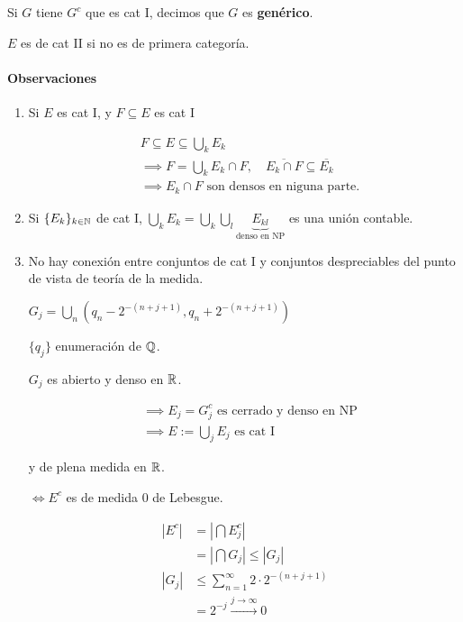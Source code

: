 \begin{fdefinition}
    Si $G$ tiene $G^c$ que es cat I, decimos que $G$ es \textbf{genérico}.
\end{fdefinition}

\begin{fdefinition}
    $E$ es de cat II si no es de primera categoría.
\end{fdefinition}

\paragraph*{Observaciones}

\begin{enumerate}
    \item Si $E$ es cat I, y $F\subseteq E$ es cat I
    
    \begin{align*}&F\subseteq E\subseteq \bigcup_k E_k\\
    &\implies F=\bigcup_k E_k\cap F,\quad \overline{E_k\cap F}\subseteq \overline{E_k}\\
    &\implies E_k\cap F \text{ son densos en niguna parte.}
    \end{align*}

    \item Si $\{E_k\}_{k\in\mathbb{N}}$ de cat I, $\bigcup_{k} E_k=\bigcup_{k}\bigcup_l \underbrace{E_{kl}}_{\text{denso en NP}}$ es una unión contable.
    
    \item No hay conexión entre conjuntos de cat I y conjuntos despreciables del punto de vista de teoría de la medida.
    \begin{fexample}
        $G_j=\bigcup_{n} (q_n-2^{-(n+j+1)},q_n+2^{-(n+j+1)})$

        $\{q_j\}$ enumeración de $\mathbb{Q}$.

        $G_j$ es abierto y denso en $\mathbb{R}$.

        \begin{align*}
            &\implies E_j=G_j^c \text{ es cerrado y denso en NP}\\
            &\implies E:=\bigcup_j E_j \text{ es cat I}
        \end{align*}

        y de plena medida en $\mathbb{R}$.

        $\iff E^c$ es de medida $0$ de Lebesgue.

        \begin{align*}
            |E^c|&=|\bigcap E_j^c|\\
            &=|\bigcap G_j|\leq |G_j|\\
            |G_j|&\leq \sum_{n=1}^\infty 2\cdot 2^{-(n+j+1)}\\
            &=2^{-j}\xrightarrow{j\to\infty} 0
        \end{align*}
    \end{fexample}
    
\end{enumerate}


